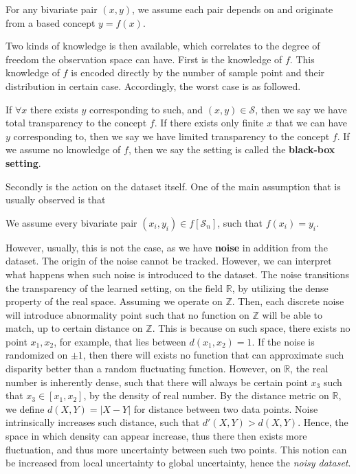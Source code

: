 \documentclass[10pt]{article} %
\begin{document}
\begin{assumption}[Transparency]
    For any bivariate pair $(x,y)$, we assume each pair depends on and originate from a based concept $y=f(x)$. 
\end{assumption}

Two kinds of knowledge is then available, which correlates to the degree of freedom the observation space can have. First is the knowledge of $f$. This knowledge of $f$ is encoded directly by the number of sample point and their distribution in certain case. Accordingly, the worst case is as followed. 

\begin{conjecture}
    If $\forall x$ there exists $y$ corresponding to such, and $(x,y)\in \mathcal{S}$, then we say we have total transparency to the concept $f$. If there exists only finite $x$ that we can have $y$ corresponding to, then we say we have limited transparency to the concept $f$. If we assume no knowledge of $f$, then we say the setting is called the \textbf{black-box setting}. 
\end{conjecture}

Secondly is the action on the dataset itself. One of the main assumption that is usually observed is that 

\begin{assumption}[Fallacy]
    We assume every bivariate pair $(x_{i},y_{i})\in f[\mathcal{S}_{n}]$, such that $f(x_{i})=y_{i}$. 
\end{assumption}

However, usually, this is not the case, as we have \textbf{noise} in addition from the dataset. The origin of the noise cannot be tracked. However, we can interpret what happens when such noise is introduced to the dataset. The noise transitions the transparency of the learned setting, on the field $\mathbb{R}$, by utilizing the dense property of the real space. Assuming we operate on $\mathbb{Z}$. Then, each discrete noise will introduce abnormality point such that no function on $\mathbb{Z}$ will be able to match, up to certain distance on $\mathbb{Z}$. This is because on such space, there exists no point $x_1, x_{2}$, for example, that lies between $d(x_{1},x_{2})=1$. If the noise is randomized on $\pm 1$, then there will exists no function that can approximate such disparity better than a random fluctuating function. However, on $\mathbb{R}$, the real number is inherently dense, such that there will always be certain point $x_{3}$ such that $x_{3}\in [x_{1},x_{2}]$, by the density of real number. By the distance metric on $\mathbb{R}$, we define $d(X,Y)=|X-Y|$ for distance between two data points. Noise intrinsically increases such distance, such that $d'(X,Y)> d(X,Y)$. Hence, the space in which density can appear increase, thus there then exists more fluctuation, and thus more uncertainty between such two points. This notion can be increased from local uncertainty to global uncertainty, hence the \textit{noisy dataset}. 
\end{document}
